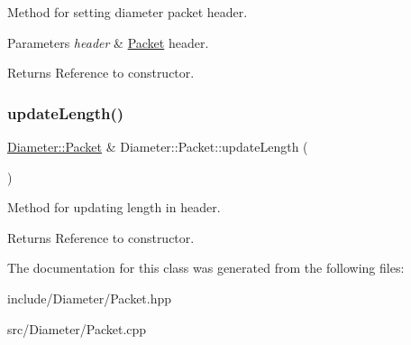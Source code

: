 Method for setting diameter packet header. 


\begin{DoxyParams}{Parameters}
{\em header} & \hyperlink{classDiameter_1_1Packet}{Packet} header. \\
\hline
\end{DoxyParams}
\begin{DoxyReturn}{Returns}
Reference to constructor. 
\end{DoxyReturn}
\mbox{\label{classDiameter_1_1Packet_a822041d59387ef2a8c0f48c2c4bc1054}} 
\subsubsection{\texorpdfstring{update\+Length()}{updateLength()}}
{\footnotesize\ttfamily \hyperlink{classDiameter_1_1Packet}{Diameter\+::\+Packet} \& Diameter\+::\+Packet\+::update\+Length (\begin{DoxyParamCaption}{ }\end{DoxyParamCaption})}



Method for updating length in header. 

\begin{DoxyReturn}{Returns}
Reference to constructor. 
\end{DoxyReturn}


The documentation for this class was generated from the following files\+:\begin{DoxyCompactItemize}
\item 
include/\+Diameter/Packet.\+hpp\item 
src/\+Diameter/Packet.\+cpp\end{DoxyCompactItemize}

